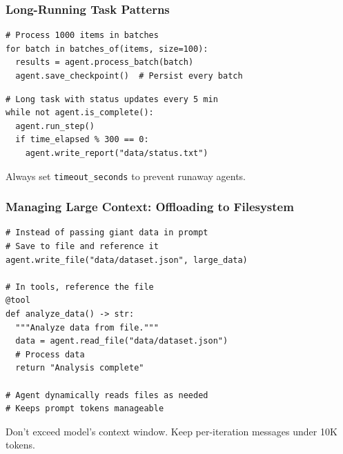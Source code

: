 \documentclass[aspectratio=169,11pt]{beamer}
\begin{document}
\begin{frame}[fragile]
\frametitle{Long-Running Task Patterns}

\begin{conceptbox}
\begin{lstlisting}
# Process 1000 items in batches
for batch in batches_of(items, size=100):
  results = agent.process_batch(batch)
  agent.save_checkpoint()  # Persist every batch
\end{lstlisting}
\end{conceptbox}

\begin{conceptbox}
\begin{lstlisting}
# Long task with status updates every 5 min
while not agent.is_complete():
  agent.run_step()
  if time_elapsed % 300 == 0:
    agent.write_report("data/status.txt")
\end{lstlisting}
\end{conceptbox}

\begin{tipbox}
Always set \texttt{timeout\_seconds} to prevent runaway agents.
\end{tipbox}

\end{frame}

\begin{frame}[fragile]
\frametitle{Managing Large Context: Offloading to Filesystem}

\begin{lstlisting}
# Instead of passing giant data in prompt
# Save to file and reference it
agent.write_file("data/dataset.json", large_data)

# In tools, reference the file
@tool
def analyze_data() -> str:
  """Analyze data from file."""
  data = agent.read_file("data/dataset.json")
  # Process data
  return "Analysis complete"

# Agent dynamically reads files as needed
# Keeps prompt tokens manageable
\end{lstlisting}

\vspace{0.8em}
\begin{warningbox}
Don't exceed model's context window. Keep per-iteration messages under 10K tokens.
\end{warningbox}

\end{frame}
\end{document}
